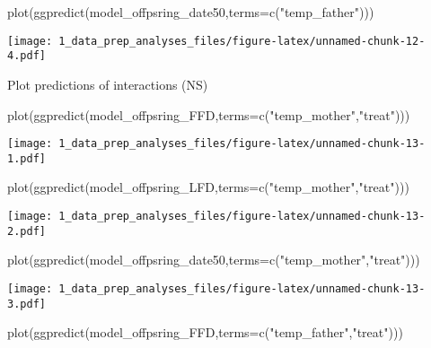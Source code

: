 \documentclass[
]{article}
\newenvironment{Shaded}{\begin{snugshade}}{\end{snugshade}}
\newcommand{\AttributeTok}[1]{\textcolor[rgb]{0.77,0.63,0.00}{#1}}
\newcommand{\FunctionTok}[1]{\textcolor[rgb]{0.00,0.00,0.00}{#1}}
\newcommand{\NormalTok}[1]{#1}
\newcommand{\StringTok}[1]{\textcolor[rgb]{0.31,0.60,0.02}{#1}}
\begin{document}
\begin{Shaded}
\begin{Highlighting}[]
\FunctionTok{plot}\NormalTok{(}\FunctionTok{ggpredict}\NormalTok{(model\_offpsring\_date50,}\AttributeTok{terms=}\FunctionTok{c}\NormalTok{(}\StringTok{"temp\_father"}\NormalTok{)))}
\end{Highlighting}
\end{Shaded}

\texttt{[image: 1\_data\_prep\_analyses\_files/figure-latex/unnamed-chunk-12-4.pdf]}

Plot predictions of interactions (NS)

\begin{Shaded}
\begin{Highlighting}[]
\FunctionTok{plot}\NormalTok{(}\FunctionTok{ggpredict}\NormalTok{(model\_offpsring\_FFD,}\AttributeTok{terms=}\FunctionTok{c}\NormalTok{(}\StringTok{"temp\_mother"}\NormalTok{,}\StringTok{"treat"}\NormalTok{)))}
\end{Highlighting}
\end{Shaded}

\texttt{[image: 1\_data\_prep\_analyses\_files/figure-latex/unnamed-chunk-13-1.pdf]}

\begin{Shaded}
\begin{Highlighting}[]
\FunctionTok{plot}\NormalTok{(}\FunctionTok{ggpredict}\NormalTok{(model\_offpsring\_LFD,}\AttributeTok{terms=}\FunctionTok{c}\NormalTok{(}\StringTok{"temp\_mother"}\NormalTok{,}\StringTok{"treat"}\NormalTok{)))}
\end{Highlighting}
\end{Shaded}

\texttt{[image: 1\_data\_prep\_analyses\_files/figure-latex/unnamed-chunk-13-2.pdf]}

\begin{Shaded}
\begin{Highlighting}[]
\FunctionTok{plot}\NormalTok{(}\FunctionTok{ggpredict}\NormalTok{(model\_offpsring\_date50,}\AttributeTok{terms=}\FunctionTok{c}\NormalTok{(}\StringTok{"temp\_mother"}\NormalTok{,}\StringTok{"treat"}\NormalTok{)))}
\end{Highlighting}
\end{Shaded}

\texttt{[image: 1\_data\_prep\_analyses\_files/figure-latex/unnamed-chunk-13-3.pdf]}

\begin{Shaded}
\begin{Highlighting}[]
\FunctionTok{plot}\NormalTok{(}\FunctionTok{ggpredict}\NormalTok{(model\_offpsring\_FFD,}\AttributeTok{terms=}\FunctionTok{c}\NormalTok{(}\StringTok{"temp\_father"}\NormalTok{,}\StringTok{"treat"}\NormalTok{)))}
\end{Highlighting}
\end{Shaded}
\end{document}
